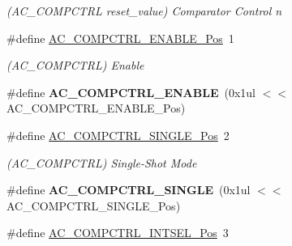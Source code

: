 \begin{DoxyCompactItemize}
\begin{DoxyCompactList}\small\item\em (A\+C\+\_\+\+C\+O\+M\+P\+C\+T\+R\+L reset\+\_\+value) Comparator Control n \end{DoxyCompactList}\item 
\hypertarget{group___s_a_m_l21___a_c_ga492935af6daf7ba71e20073cd04c4e79}{}\#define \hyperlink{group___s_a_m_l21___a_c_ga492935af6daf7ba71e20073cd04c4e79}{A\+C\+\_\+\+C\+O\+M\+P\+C\+T\+R\+L\+\_\+\+E\+N\+A\+B\+L\+E\+\_\+\+Pos}~1\label{group___s_a_m_l21___a_c_ga492935af6daf7ba71e20073cd04c4e79}

\begin{DoxyCompactList}\small\item\em (A\+C\+\_\+\+C\+O\+M\+P\+C\+T\+R\+L) Enable \end{DoxyCompactList}\item 
\hypertarget{group___s_a_m_l21___a_c_ga21c7bfe2dcc17cc45ab919eef9a1263b}{}\#define {\bfseries A\+C\+\_\+\+C\+O\+M\+P\+C\+T\+R\+L\+\_\+\+E\+N\+A\+B\+L\+E}~(0x1ul $<$$<$ A\+C\+\_\+\+C\+O\+M\+P\+C\+T\+R\+L\+\_\+\+E\+N\+A\+B\+L\+E\+\_\+\+Pos)\label{group___s_a_m_l21___a_c_ga21c7bfe2dcc17cc45ab919eef9a1263b}

\item 
\hypertarget{group___s_a_m_l21___a_c_gaf813cfd0ab476ddfe67bfe59dfe42c2b}{}\#define \hyperlink{group___s_a_m_l21___a_c_gaf813cfd0ab476ddfe67bfe59dfe42c2b}{A\+C\+\_\+\+C\+O\+M\+P\+C\+T\+R\+L\+\_\+\+S\+I\+N\+G\+L\+E\+\_\+\+Pos}~2\label{group___s_a_m_l21___a_c_gaf813cfd0ab476ddfe67bfe59dfe42c2b}

\begin{DoxyCompactList}\small\item\em (A\+C\+\_\+\+C\+O\+M\+P\+C\+T\+R\+L) Single-\/\+Shot Mode \end{DoxyCompactList}\item 
\hypertarget{group___s_a_m_l21___a_c_ga8b648254cbb59fb7e79854e23f465a60}{}\#define {\bfseries A\+C\+\_\+\+C\+O\+M\+P\+C\+T\+R\+L\+\_\+\+S\+I\+N\+G\+L\+E}~(0x1ul $<$$<$ A\+C\+\_\+\+C\+O\+M\+P\+C\+T\+R\+L\+\_\+\+S\+I\+N\+G\+L\+E\+\_\+\+Pos)\label{group___s_a_m_l21___a_c_ga8b648254cbb59fb7e79854e23f465a60}

\item 
\hypertarget{group___s_a_m_l21___a_c_gaf17b8514f92bb9fa7999607938ab4994}{}\#define \hyperlink{group___s_a_m_l21___a_c_gaf17b8514f92bb9fa7999607938ab4994}{A\+C\+\_\+\+C\+O\+M\+P\+C\+T\+R\+L\+\_\+\+I\+N\+T\+S\+E\+L\+\_\+\+Pos}~3\label{group___s_a_m_l21___a_c_gaf17b8514f92bb9fa7999607938ab4994}


\end{DoxyCompactItemize}
